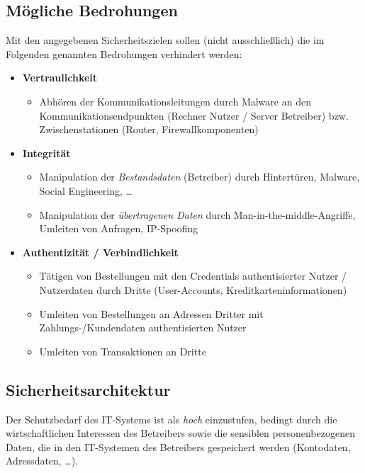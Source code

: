 \subsection{Mögliche Bedrohungen}

Mit den angegebenen Sicherheitszielen sollen (nicht ausschließlich) die im Folgenden genannten Bedrohungen verhindert werden:


\begin{itemize}
    \itemsep0.5em
    \item \textbf{Vertraulichkeit}
    \begin{itemize}
        \item Abhören der Kommunikationsleitungen durch Malware an den Kommunikationsendpunkten (Rechner Nutzer / Server Betreiber) bzw. Zwischenstationen (Router, Firewallkomponenten)
    \end{itemize}
    \item \textbf{Integrität}
    \begin{itemize}
        \item Manipulation der \textit{Bestandsdaten} (Betreiber) durch Hintertüren, Malware, Social Engineering, \ldots
        \item Manipulation der \textit{übertragenen Daten} durch Man-in-the-middle-Angriffe, Umleiten von Anfragen, IP-Spoofing
    \end{itemize}
    \item \textbf{Authentizität / Verbindlichkeit}
    \begin{itemize}
        \item Tätigen von Bestellungen mit den Credentials authentisierter Nutzer / Nutzerdaten durch Dritte (User-Accounts, Kreditkarteninformationen)
        \item Umleiten von Bestellungen an Adressen Dritter mit Zahlungs-/Kundendaten authentisierten Nutzer
        \item Umleiten von Transaktionen an Dritte
    \end{itemize}
\end{itemize}

\subsection{Sicherheitsarchitektur}

Der Schutzbedarf des IT-Systems ist als \textit{hoch} einzustufen, bedingt durch die wirtschaftlichen Interessen des Betreibers sowie die sensiblen personenbezogenen Daten, die in den IT-Systemen des Betreibers gespeichert werden (Kontodaten, Adressdaten, \ldots).\\

